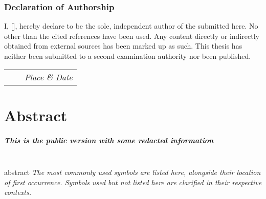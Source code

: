 \subsection*{Declaration of Authorship}
{%
\makeatletter
I, \@author{} [\@immnumber], hereby declare to be the sole, independent author of the \@subject{} submitted here.
No other than the cited references have been used.
Any content directly or indirectly obtained from external sources has been marked up as such.
This thesis has neither been submitted to a second examination authority nor been published.\\[\baselineskip]

\begin{center}
	\begin{tabular}{M{12em}M{4em}M{12em}}
		{\itshape\@author} & & \textit{Place \& Date}\\
	\end{tabular}
\end{center}
\makeatother%
}%
\cleardoublepage
\chapter*{Abstract}
\ifpublished
\paragraph{This is the public version with some redacted information}\hrulefill\\
\fi
{abstract}%
\tableofcontents%
\textit{The most commonly used symbols are listed here, alongside their location of first occurrence. Symbols used but not listed here are clarified in their respective contexts.}

